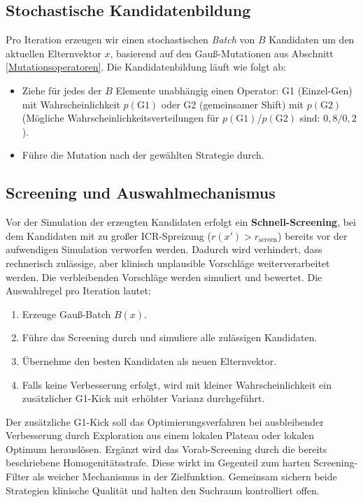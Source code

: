 \subsection{Stochastische Kandidatenbildung}
Pro Iteration erzeugen wir einen stochastischen \emph{Batch} von $B$ Kandidaten um den aktuellen Elternvektor $x$, basierend auf den Gau{\ss}-Mutationen aus Abschnitt \ref{Mutationsoperatoren}. Die Kandidatenbildung läuft wie folgt ab:
\begin{itemize}
  \item Ziehe f\"ur jedes der $B$ Elemente unabh\"angig einen Operator: G1 (Einzel-Gen) mit Wahrscheinlichkeit $p(\mathrm{G1})$ oder G2 (gemeinsamer Shift) mit $p(\mathrm{G2})$ (Mögliche Wahrscheinlichkeitsverteilungen für $p(\mathrm{G1})$/$p(\mathrm{G2})$ sind: $0{,}8/0{,}2$).
  \item Führe die Mutation nach der gewählten Strategie durch.
\end{itemize}

\subsection{Screening und Auswahlmechanismus}
Vor der Simulation der erzeugten Kandidaten erfolgt ein \textbf{Schnell-Screening}, bei dem Kandidaten mit zu großer ICR-Spreizung ($r(x') > r_{\text{screen}}$) bereits vor der aufwendigen Simulation verworfen werden. Dadurch wird verhindert, dass rechnerisch zulässige, aber klinisch unplausible Vorschläge weiterverarbeitet werden. Die verbleibenden Vorschläge werden simuliert und bewertet. Die Auswahlregel pro Iteration lautet:
\begin{enumerate}
  \item Erzeuge Gauß-Batch $B(x)$.
  \item Führe das Screening durch und simuliere alle zulässigen Kandidaten.
  \item Übernehme den besten Kandidaten als neuen Elternvektor.
  \item Falls keine Verbesserung erfolgt, wird mit kleiner Wahrscheinlichkeit ein zusätzlicher G1-Kick mit erhöhter Varianz durchgeführt.
\end{enumerate}
Der zusätzliche G1-Kick soll das Optimierungsverfahren bei ausbleibender Verbesserung durch Exploration aus einem lokalen Plateau oder lokalen Optimum herauslösen. Ergänzt wird das Vorab-Screening durch die bereits beschriebene Homogenitätsstrafe. Diese wirkt im Gegenteil zum harten Screening-Filter als weicher Mechanismus in der Zielfunktion. Gemeinsam sichern beide Strategien klinische Qualität und halten den Suchraum kontrolliert offen.

